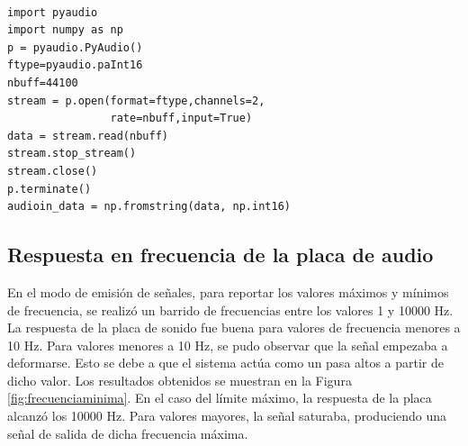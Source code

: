\documentclass[a4paper,10pt]{article}
\begin{document}
\lstset{language=Python}
\begin{lstlisting}[frame=single]  % Start your code-block

import pyaudio
import numpy as np
p = pyaudio.PyAudio()
ftype=pyaudio.paInt16
nbuff=44100
stream = p.open(format=ftype,channels=2,
                rate=nbuff,input=True)
data = stream.read(nbuff)
stream.stop_stream()
stream.close()
p.terminate()
audioin_data = np.fromstring(data, np.int16)
\end{lstlisting}
% 
% 

\subsection{Respuesta en frecuencia de la placa de audio}

En el modo de emisión de señales, para reportar los valores máximos 
y mínimos de frecuencia, se realizó un barrido de frecuencias entre 
los valores 1 y 10000 Hz. La respuesta de la placa de sonido fue
buena para valores de frecuencia menores a 10 Hz. Para valores
menores a 10 Hz, se pudo observar que la señal empezaba a deformarse.
Esto se debe a que el sistema actúa como un pasa altos a partir de 
dicho valor. Los resultados obtenidos se muestran en la Figura 
\ref{fig:frecuenciaminima}. En el caso del límite máximo, la
respuesta de la placa alcanzó los 10000 Hz. Para valores mayores, la
señal saturaba, produciendo una señal de salida de dicha frecuencia
máxima. 
\end{document}
